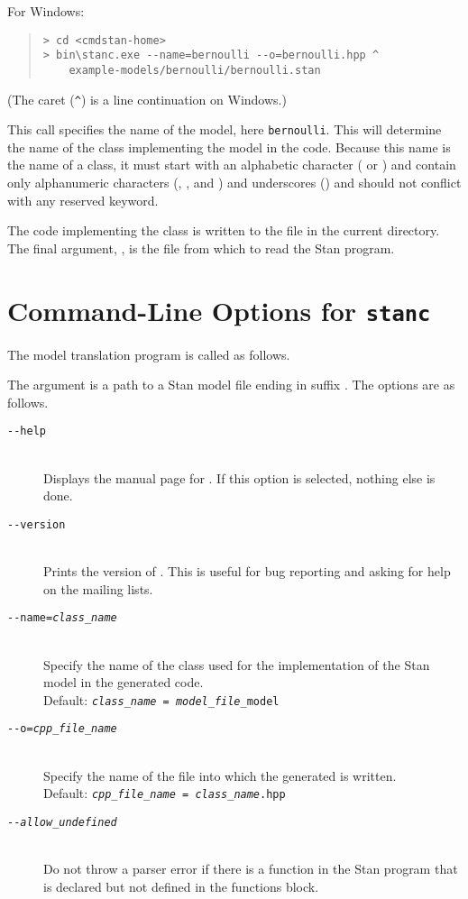 For Windows:
%
\begin{quote}
\begin{Verbatim}[fontshape=sl]
> cd <cmdstan-home>
> bin\stanc.exe --name=bernoulli --o=bernoulli.hpp ^
    example-models/bernoulli/bernoulli.stan 
\end{Verbatim}
\end{quote}
%
(The caret (\Verb|^|) is a line continuation on Windows.)

This call specifies the name of the model, here {\tt bernoulli}.
This will determine the name of the class implementing the model in
the \Cpp code.  Because this name is the name of a \Cpp class, it must
start with an alphabetic character ( or ) and
contain only alphanumeric characters (, , and
) and underscores (\code{\_}) and should not conflict with
any \Cpp reserved keyword.  

The \Cpp code implementing the class is written to the file
 in the current directory.  The final argument,
, is the file from which to read the Stan
program.

\section{Command-Line Options for {\tt\bfseries stanc}}

The model translation program  is called as follows.
%
\begin{quote}
\end{quote}
%
The argument  is a path to a Stan model
file ending in suffix .  The options are as follows.
%
\begin{description}
%
\item[\tt {-}-help] 
\mbox{ } \\ 
Displays the manual page for \stanc.  If this option is selected,
nothing else is done.
%
\item[\tt {-}-version]
\mbox{ } \\ 
Prints the version of \stanc.  This is useful for bug reporting
and asking for help on the mailing lists.
%
\item[\tt {-}-name={\slshape class\_name}]
\mbox{ } \\ 
Specify the name of the class used for the implementation of the
Stan model in the generated \Cpp code.  
\\[2pt]
Default: {\tt {\slshape class\_name = model\_file}\_model}
%
\item[\tt {-}-o={\slshape cpp\_file\_name}]
\mbox{ } \\ 
Specify the name of the file into which the generated \Cpp is written.
\\[2pt]
Default: {\tt {\slshape cpp\_file\_name} = {\slshape class\_name}.hpp}
%
\item[\tt {-}-{\slshape allow\_undefined}]
\mbox{ } \\ 
Do not throw a parser error if there is a function in the Stan program
that is declared but not defined in the functions block.
%
\end{description}

